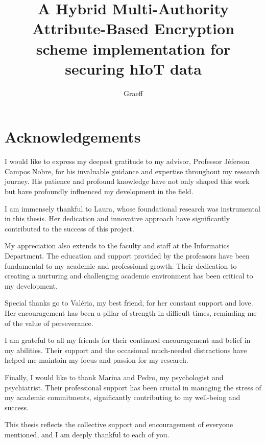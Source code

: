 \documentclass[cic,tc,english]{iiufrgs}
\title{
    A Hybrid Multi-Authority Attribute-Based Encryption scheme implementation for securing hIoT data
}
\author{Graeff}{Felipe de Almeida}
\begin{document}
\maketitle



\chapter*{Acknowledgements}
    I would like to express my deepest gratitude to my advisor, Professor 
    Jéferson Campos Nobre, for his invaluable guidance and expertise throughout 
    my research journey. His patience and profound knowledge have not only 
    shaped this work but have profoundly influenced my development in the field.

    I am immensely thankful to Laura, whose foundational research was 
    instrumental in this thesis. Her dedication and innovative approach have 
    significantly contributed to the success of this project.

    My appreciation also extends to the faculty and staff at the Informatics 
    Department. The education and support provided by the professors have
    been fundamental to my academic and professional growth. Their dedication to
    creating a nurturing and challenging academic environment has been critical 
    to my development.

    Special thanks go to Valéria, my best friend, for her constant support and 
    love. Her encouragement has been a pillar of strength in difficult times, 
    reminding me of the value of perseverance.

    I am grateful to all my friends for their continued encouragement and belief
    in my abilities. Their support and the occasional much-needed distractions 
    have helped me maintain my focus and passion for my research.

    Finally, I would like to thank Marina and Pedro, my psychologist and 
    psychiatrist. Their professional support has been crucial in managing the 
    stress of my academic commitments, significantly contributing to my 
    well-being and success.

    This thesis reflects the collective support and encouragement of everyone 
    mentioned, and I am deeply thankful to each of you.



\begin{abstract}
    \lipsum[1]
\end{abstract}
\end{document}
